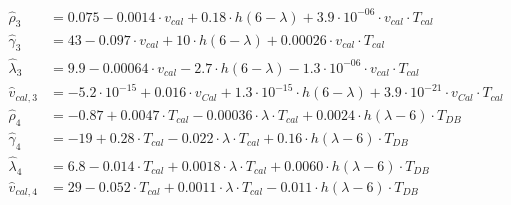 \begin{align}
%
%
%
    \label{eq:emma-phd3}
    \hat{\rho}_3 &= 0.075  -   0.0014 \cdot  v_{cal}  +    0.18 \cdot  h(6-\lambda)  + 3.9\cdot 10^{-06} \cdot  v_{cal}\cdot T_{cal} \\
    \label{eq:emma-G3}
    \hat{\gamma}_3 &= 43  -   0.097 \cdot  v_{cal}  +     10 \cdot  h(6-\lambda)  + 0.00026 \cdot  v_{cal}\cdot T_{cal} \\
    \label{eq:emma-layr3}
    \hat{\lambda}_3 &= 9.9  - 0.00064 \cdot  v_{cal}  -     2.7 \cdot  h(6-\lambda)  - 1.3\cdot 10^{-06} \cdot  v_{cal}\cdot T_{cal} \\
    \label{eq:emma-vcal3}
    \hat{v}_{cal,3} &= -5.2\cdot 10^{-15}  +   0.016 \cdot  v_{Cal}  + 1.3\cdot 10^{-15} \cdot  h(6-\lambda)  + 3.9\cdot 10^{-21} \cdot  v_{Cal}\cdot T_{cal} \\
%
    \label{eq:emma-phd4}
    \hat{\rho}_4 &=  -0.87 + 0.0047 \cdot  T_{cal} - 0.00036 \cdot  \lambda\cdot T_{cal}  +  0.0024 \cdot  h(\lambda-6)\cdot T_{DB} \\
    \label{eq:emma-G4}
    \hat{\gamma}_4 &=     -19 + 0.28 \cdot  T_{cal}  - 0.022 \cdot  \lambda\cdot T_{cal}  +  0.16 \cdot  h(\lambda-6)\cdot T_{DB} \\
    \label{eq:emma-layr4}
    \hat{\lambda}_4 &=  6.8 - 0.014 \cdot  T_{cal}  + 0.0018 \cdot  \lambda\cdot T_{cal}  + 0.0060 \cdot  h(\lambda-6)\cdot T_{DB} \\
    \label{eq:emma-vcal4}
    \hat{v}_{cal,4} &=  29 - 0.052 \cdot  T_{cal}  + 0.0011 \cdot  \lambda\cdot T_{cal}  -  0.011 \cdot  h(\lambda-6)\cdot T_{DB} 
\end{align}

